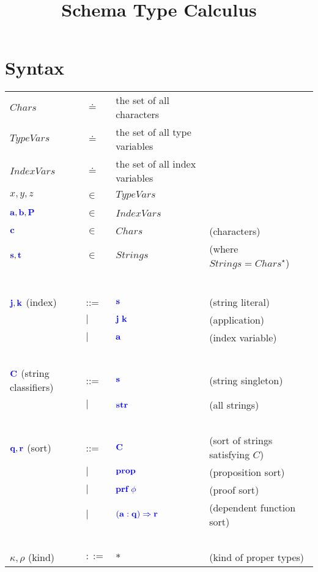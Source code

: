 \documentclass{article}
\title{Schema Type Calculus}
\newcommand{\blu}[1]{\mathbf{\color{blue}{#1}}}
\begin{document}
\maketitle

\section*{Syntax}

\begin{tabular}{llll}
$\mathit{Chars}$ & $\doteq$ & the set of all characters \\
$\mathit{TypeVars}$ & $\doteq$ & the set of all type variables \\
$\mathit{IndexVars}$ & $\doteq$ & the set of all index variables \\
$x,y,z$ & $\in$ & $\mathit{TypeVars}$ & ~ \\
$\blu{a}, \blu{b}, \blu{P}$ & $\in$ & $\mathit{IndexVars}$ & ~ \\
$\blu{c}$ & $\in$ & $\mathit{Chars}$ & (characters) \\
$\blu{s},\blu{t}$ & $\in$ & $\mathit{Strings}$ & (where $\mathit{Strings} = \mathit{Chars}^{\star}$) \\~\\
 & & \\
$\blu{j},\blu{k}$ (index) & ::=  & $\blu{s}$ & (string literal) \\
                          & $\mid$ & $\blu{j}~\blu{k}$ & (application) \\
                          & $\mid$ & $\blu{a}$ & (index variable) \\~\\
$\blu{C}$ (string classifiers) & ::= & $\blu{s}$ & (string singleton) \\
                         & $\mid$ & $\blu{str}$ & (all strings) \\~\\
$\blu{q},\blu{r}$ (sort) & ::= & $\blu{C}$ & (sort of strings satisfying $C$) \\
                         & $\mid$ & $\blu{\textbf{prop}}$ & (proposition sort) \\
                         & $\mid$ & $\blu{\textbf{prf}~\phi}$ & (proof sort) \\
                         & $\mid$ & $\blu{(a : q) \Rightarrow r}$ & (dependent function sort) \\~\\
$\kappa,\rho$ (kind) & $::=$ & $\ast$ & (kind of proper types) \\

\end{tabular}
\end{document}
